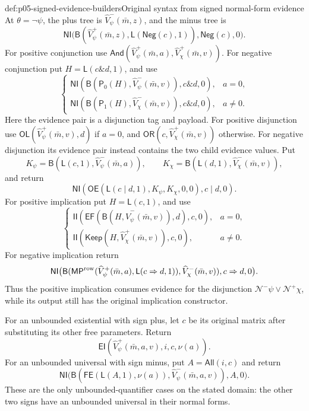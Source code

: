 \begin{hbdefinition}{def:p05-signed-evidence-builders}{Original syntax from signed normal-form evidence}
At \(\theta=\neg\psi\), the plus tree is
\(\widehat V_\psi^-(\bar m,z)\), and the minus tree is
\[
 \mathsf{NI}\bigl(
   \mathsf B(\widehat V_\psi^+(\bar m,z),
                         \mathsf L(\mathsf{Neg}(c),1)),
                                      \mathsf{Neg}(c),0\bigr).
\]
For positive conjunction use
\(\mathsf{And}(\widehat V_\psi^+(\bar m,a),
\widehat V_\chi^+(\bar m,v))\). For negative conjunction put
\(H=\mathsf L(c\mathbin{\&}d,1)\), and use
\[
 \begin{cases}
  \mathsf{NI}(\mathsf B(\mathsf P_0(H),
        \widehat V_\psi^-(\bar m,v)),c\mathbin{\&}d,0),&a=0,\\
  \mathsf{NI}(\mathsf B(\mathsf P_1(H),
        \widehat V_\chi^-(\bar m,v)),c\mathbin{\&}d,0),&a\ne0.
 \end{cases}
\]
Here the evidence pair is a disjunction tag and payload. For positive
disjunction use
\(\mathsf{OL}(\widehat V_\psi^+(\bar m,v),d)\) if \(a=0\),
and \(\mathsf{OR}(c,\widehat V_\chi^+(\bar m,v))\) otherwise.
For negative disjunction its evidence pair instead contains the two
child evidence values. Put
\[
 K_\psi=\mathsf B(\mathsf L(c,1),\widehat V_\psi^-(\bar m,a)),\qquad
 K_\chi=\mathsf B(\mathsf L(d,1),\widehat V_\chi^-(\bar m,v)),
\]
and return
\[
 \mathsf{NI}(\mathsf{OE}(\mathsf L(c\mathbin{|}d,1),
                            K_\psi,K_\chi,0,0),c\mathbin{|}d,0).
\]
For positive implication put \(H=\mathsf L(c,1)\), and use
\[
 \begin{cases}
  \mathsf{II}(\mathsf{EF}(\mathsf B(H,
                  \widehat V_\psi^-(\bar m,v)),d),c,0),&a=0,\\
  \mathsf{II}(\mathsf{Keep}(H,
                  \widehat V_\chi^+(\bar m,v)),c,0),&a\ne0.
 \end{cases}
\]
For negative implication return
\[
 \mathsf{NI}\bigl(
   \mathsf B(\mathsf{MP}^{\rm row}(\widehat V_\psi^+(\bar m,a),
                       \mathsf L(c\Rightarrow d,1)),
                  \widehat V_\chi^-(\bar m,v)),c\Rightarrow d,0\bigr).
\]
Thus the positive implication consumes evidence for the disjunction
\(\mathcal N^-\psi\lor\mathcal N^+\chi\), while its output
still has the original implication constructor.

For an unbounded existential with sign plus, let \(c\) be its original
matrix after substituting its other free parameters. Return
\[
     \mathsf{EI}(\widehat V_\psi^+(\bar m,a,v),i,c,\nu(a)).
\]
For an unbounded universal with sign minus, put
\(A=\mathsf{All}(i,c)\) and return
\[
 \mathsf{NI}\bigl(
  \mathsf B(\mathsf{FE}(\mathsf L(A,1),\nu(a)),
                     \widehat V_\psi^-(\bar m,a,v)),A,0\bigr).
\]
These are the only unbounded-quantifier cases on the stated domain:
the other two signs have an unbounded universal in their normal forms.


\end{hbdefinition}
